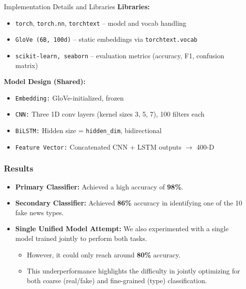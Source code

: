 \documentclass{beamer}
\begin{document}
\begin{frame}{Implementation Details and Libraries}
    \textbf{\textcolor{structure}{Libraries:}}
    \begin{itemize}
        \item \texttt{torch}, \texttt{torch.nn}, \texttt{torchtext} – model and vocab handling
        \item \texttt{GloVe (6B, 100d)} – static embeddings via \texttt{torchtext.vocab}
        \item \texttt{scikit-learn, seaborn} – evaluation metrics (accuracy, F1, confusion matrix)
    \end{itemize}

    \textbf{\textcolor{structure}{Model Design (Shared):}}
    \begin{itemize}
        \item \texttt{Embedding:} GloVe-initialized, frozen
        \item \texttt{CNN:} Three 1D conv layers (kernel sizes 3, 5, 7), 100 filters each
        \item \texttt{BiLSTM:} Hidden size = \texttt{hidden\_dim}, bidirectional
        \item \texttt{Feature Vector:} Concatenated CNN + LSTM outputs $\rightarrow$ 400-D
    \end{itemize}

\end{frame}




\begin{frame}
    \frametitle{Results}
    
    \begin{itemize}
        \item \textbf{\textcolor{structure}{Primary Classifier:}} Achieved a high accuracy of \textbf{98\%}.
        
        \item \textbf{\textcolor{structure}{Secondary Classifier:}} Achieved \textbf{86\%} accuracy in identifying one of the 10 fake news types.
        
        \item \textbf{\textcolor{structure}{Single Unified Model Attempt:}} We also experimented with a single model trained jointly to perform both tasks.
        \begin{itemize}
            \item However, it could only reach around \textbf{80\%} accuracy.
            \item This underperformance highlights the difficulty in jointly optimizing for both coarse (real/fake) and fine-grained (type) classification.
        \end{itemize}
    \end{itemize}
    
\end{frame}
    
\end{document}
